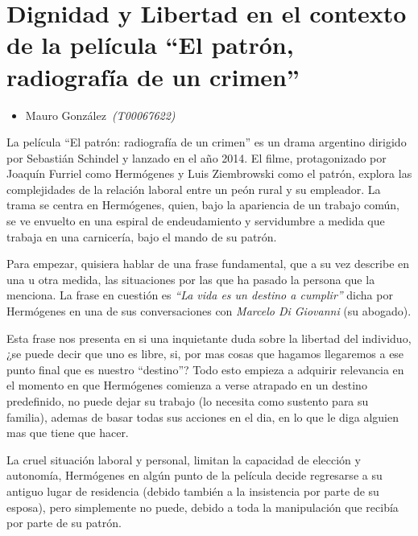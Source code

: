 \documentclass[letterpaper, 12pt]{article}
\begin{document}
\section*{Dignidad y Libertad en el contexto de la película ``El patrón, radiografía de un crimen''}

\noindent\makebox[\linewidth]{\rule{\textwidth}{0.4pt}}

\begin{itemize}[label=$\diamond$]
    \item Mauro González~\textit{(T00067622)}
\end{itemize}

\noindent\makebox[\linewidth]{\rule{\textwidth}{0.4pt}}

\nocite{patron2014}
\nocite{39657713009}


La película ``El patrón: radiografía de un crimen'' es un
drama argentino dirigido por Sebastián Schindel y lanzado
en el año 2014. El filme, protagonizado por Joaquín Furriel
como Hermógenes y Luis Ziembrowski como el patrón, explora
las complejidades de la relación laboral entre un peón
rural y su empleador. La trama se centra en Hermógenes,
quien, bajo la apariencia de un trabajo común, se ve
envuelto en una espiral de endeudamiento y servidumbre a
medida que trabaja en una carnicería, bajo el mando de su
patrón.

Para empezar, quisiera hablar de una frase fundamental, que
a su vez describe en una u otra medida, las situaciones por
las que ha pasado la persona que la menciona. La frase en
cuestión es \textit{``La vida es un destino a cumplir''}
dicha por Hermógenes en una de sus conversaciones con
\textit{Marcelo Di Giovanni} (su abogado).

Esta frase nos presenta en si una inquietante duda sobre la
libertad del individuo, ¿se puede decir que uno es libre,
si, por mas cosas que hagamos llegaremos a ese punto final
que es nuestro ``destino''? Todo esto empieza a adquirir
relevancia en el momento en que Hermógenes comienza a verse
atrapado en un destino predefinido, no puede dejar su
trabajo (lo necesita como sustento para su familia), ademas
de basar todas sus acciones en el dia, en lo que le diga
alguien mas que tiene que hacer.

La cruel situación laboral y personal, limitan la capacidad
de elección y autonomía, Hermógenes en algún punto de la
película decide regresarse a su antiguo lugar de residencia
(debido también a la insistencia por parte de su esposa),
pero simplemente no puede, debido a toda la manipulación
que recibía por parte de su patrón.
\end{document}
